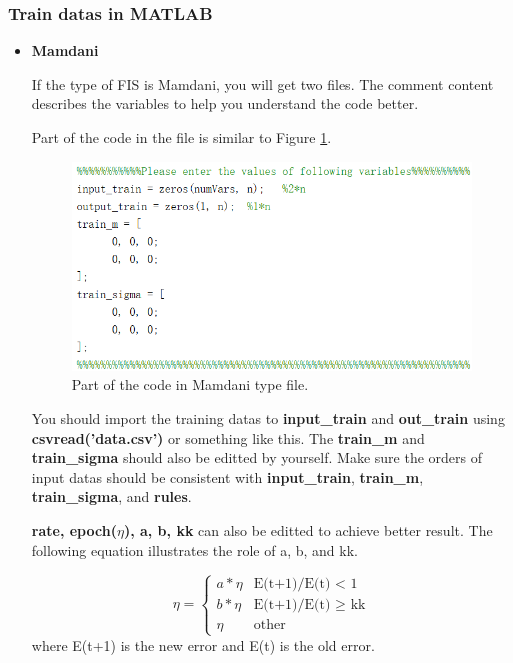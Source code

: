 \documentclass[journal,a4paper,onecolumn]{article}
\begin{document}
\subsubsection{Train datas in MATLAB}
\begin{itemize}
	\item \textbf{Mamdani}
	
	If the type of FIS is Mamdani, you will get two files. The comment content describes the variables to help you understand the code better.
	
	Part of the code in the file is similar to Figure \ref{fig:Part of the code in Mamdani type file.}.
	\begin{figure}[!hbt]
		\begin{center}
			\includegraphics[width=\columnwidth]{fig62}
			\caption{Part of the code in Mamdani type file.}
			\label{fig:Part of the code in Mamdani type file.}
		\end{center}
	\end{figure}
	You should import the training datas to \textbf{input\_train} and \textbf{out\_train} using \textbf{csvread('data.csv')} or something like this. The \textbf{train\_m} and \textbf{train\_sigma} should also be editted by yourself. Make sure the orders of input datas should be consistent with \textbf{input\_train}, \textbf{train\_m}, \textbf{train\_sigma}, and \textbf{rules}.
	
	\textbf{rate, epoch($\eta$), a, b, kk} can also be editted to achieve better result. The following equation illustrates the role of a, b, and kk.
	
	\begin{equation}    
	\eta =
	\begin{cases}
	a*\eta   &  \text{E(t+1)/E(t) < 1} \\
	b*\eta	 &  \text{E(t+1)/E(t) $\ge$ kk}\\
	\eta     &  \text{other}
	\end{cases}                
	\end{equation}
	where E(t+1) is the new error and E(t) is the old error.
	

\end{itemize}
\end{document}
